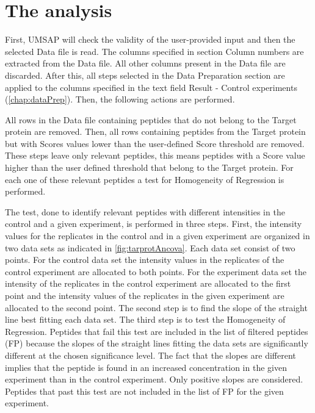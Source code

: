 \section{The analysis}

First, UMSAP will check the validity of the user-provided input and then the selected
Data file is read. The columns specified in section Column numbers are extracted
from the Data file. All other columns present in the Data file are discarded. After
this, all steps selected in the Data Preparation section are applied to the columns
specified in the text field Result - Control experiments (\autoref{chap:dataPrep}).
Then, the following actions are performed.

All rows in the Data file containing peptides that do not belong to the Target protein
are removed. Then, all rows containing peptides from the Target protein but with
Scores values lower than the user-defined Score threshold are removed. These steps
leave only relevant peptides, this means peptides with a Score value higher than
the user defined threshold that belong to the Target protein. For each one of these
relevant peptides a test for Homogeneity of Regression \cite{ancova} is performed.

The test, \label{par:tarprotAncovaTest} done to identify relevant peptides with
different intensities in the control and a given experiment, is performed in three
steps. First, the intensity values for the replicates in the control and in a given
experiment are organized in two data sets as indicated in \autoref{fig:tarprotAncova}.
Each data set consist of two points. For the control data set the intensity values
in the replicates of the control experiment are allocated to both points. For the
experiment data set the intensity of the replicates in the control experiment are
allocated to the first point and the intensity values of the replicates in the given
experiment are allocated to the second point. The second step is to find the slope
of the straight line best fitting each data set. The third step is to test the
Homogeneity of Regression. Peptides that fail this test are included in the list of
filtered peptides (FP) because the slopes of the straight lines fitting the data
sets are significantly different at the chosen significance level. The fact that
the slopes are different implies that the peptide is found in an increased
concentration in the given experiment than in the control experiment. Only positive
slopes are considered. Peptides that past this test are not included in the list of
FP for the given experiment. 

